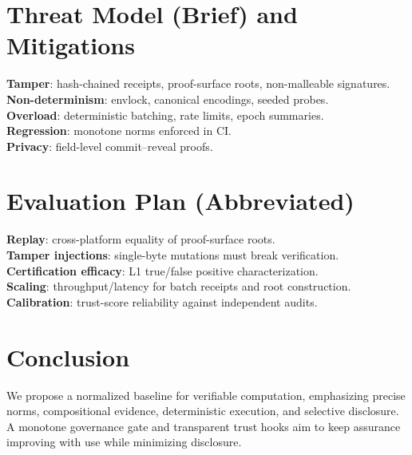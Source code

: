 \documentclass[11pt,a4paper]{article}
\numberwithin{equation}{section}
\theoremstyle{plain}
\theoremstyle{definition}
\theoremstyle{remark}
\begin{document}
\section{Threat Model (Brief) and Mitigations}
\textbf{Tamper}: hash-chained receipts, proof-surface roots, non-malleable signatures. \\
\textbf{Non-determinism}: envlock, canonical encodings, seeded probes. \\
\textbf{Overload}: deterministic batching, rate limits, epoch summaries. \\
\textbf{Regression}: monotone norms enforced in CI. \\
\textbf{Privacy}: field-level commit–reveal proofs.

\section{Evaluation Plan (Abbreviated)}
\textbf{Replay}: cross-platform equality of proof-surface roots. \\
\textbf{Tamper injections}: single-byte mutations must break verification. \\
\textbf{Certification efficacy}: L1 true/false positive characterization. \\
\textbf{Scaling}: throughput/latency for batch receipts and root construction. \\
\textbf{Calibration}: trust-score reliability against independent audits.

\section{Conclusion}
We propose a normalized baseline for verifiable computation, emphasizing precise norms, compositional evidence, deterministic execution, and selective disclosure. A monotone governance gate and transparent trust hooks aim to keep assurance improving with use while minimizing disclosure.

% 
% 
\end{document}

